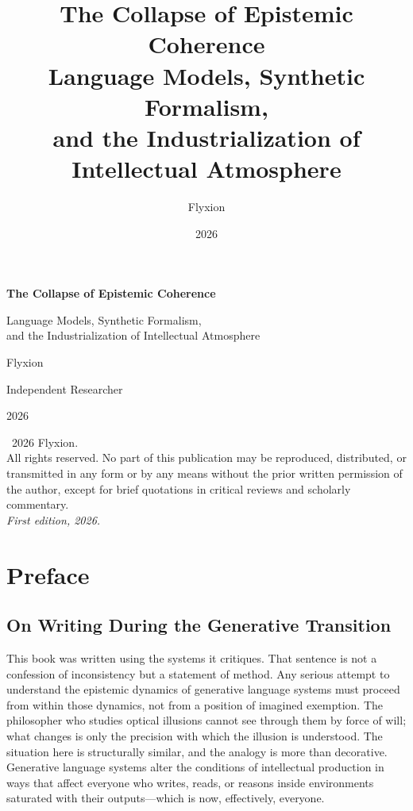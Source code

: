 \documentclass[12pt, openright, twoside]{book}
\title{\textbf{The Collapse of Epistemic Coherence}\\[8pt]
\large Language Models, Synthetic Formalism,\\
and the Industrialization of Intellectual Atmosphere}
\author{Flyxion}
\date{2026}
\begin{document}
\frontmatter

\begin{titlepage}
\centering
\vspace*{3cm}
{\Huge\bfseries The Collapse of Epistemic Coherence\par}
\vspace{1.2cm}
{\Large Language Models, Synthetic Formalism,\\[4pt]
and the Industrialization of Intellectual Atmosphere\par}
\vfill
{\large Flyxion\par}
\vspace{0.5cm}
{\normalsize Independent Researcher\par}
\vspace{2cm}
{\normalsize 2026\par}
\end{titlepage}

\thispagestyle{empty}
\vspace*{\fill}
\noindent
\textcopyright\ 2026 Flyxion.\\[4pt]
All rights reserved. No part of this publication may be reproduced,
distributed, or transmitted in any form or by any means without the
prior written permission of the author, except for brief quotations
in critical reviews and scholarly commentary.\\[12pt]
\noindent
\textit{First edition, 2026.}
\vspace*{\fill}
\newpage

\tableofcontents
\clearpage

\mainmatter

\chapter*{Preface}

\section*{On Writing During the Generative Transition}

This book was written using the systems it critiques. That sentence is not a confession
of inconsistency but a statement of method. Any serious attempt to understand the
epistemic dynamics of generative language systems must proceed from within those
dynamics, not from a position of imagined exemption. The philosopher who studies
optical illusions cannot see through them by force of will; what changes is only the
precision with which the illusion is understood. The situation here is structurally
similar, and the analogy is more than decorative. Generative language systems alter
the conditions of intellectual production in ways that affect everyone who writes,
reads, or reasons inside environments saturated with their outputs---which is now,
effectively, everyone.
\end{document}
